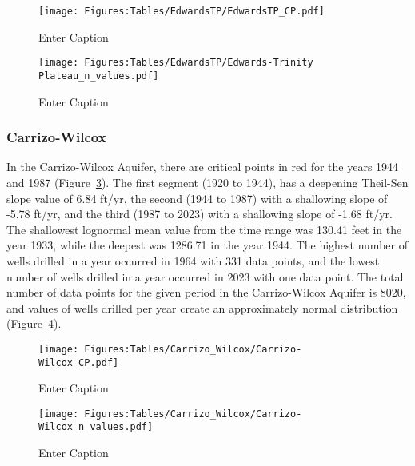 \begin{figure}[H]
    \centering
    \texttt{[image: Figures:Tables/EdwardsTP/EdwardsTP\_CP.pdf]}
    \caption{Enter Caption}
    \label{fig:ETP_CP}
\end{figure}
\begin{figure}[H]
    \centering
    \texttt{[image: Figures:Tables/EdwardsTP/Edwards-Trinity Plateau\_n\_values.pdf]}
    \caption{Enter Caption}
    \label{fig:ETP_n_value}
\end{figure}

\subsubsection*{Carrizo-Wilcox}
In the Carrizo-Wilcox Aquifer, there are critical points in red for the years 1944 and 1987 (Figure~\ref{fig:CW_CP}). The first segment (1920 to 1944),  has a deepening Theil-Sen slope value of 6.84 ft/yr, the second (1944 to 1987) with a shallowing slope of -5.78 ft/yr, and the third (1987 to 2023) with a shallowing slope of -1.68 ft/yr. The shallowest lognormal mean value from the time range was 130.41 feet in the year 1933, while the deepest was 1286.71 in the year 1944. The highest number of wells drilled in a year occurred in 1964 with 331 data points, and the lowest number of wells drilled in a year occurred in 2023 with one data point. The total number of data points for the given period in the Carrizo-Wilcox Aquifer is 8020, and values of wells drilled per year create an approximately normal distribution (Figure~\ref{fig:CW_n_value}).

\begin{figure}[H]
    \centering
    \texttt{[image: Figures:Tables/Carrizo\_Wilcox/Carrizo-Wilcox\_CP.pdf]}
    \caption{Enter Caption}
    \label{fig:CW_CP}
\end{figure}

\begin{figure}[H]
    \centering
    \texttt{[image: Figures:Tables/Carrizo\_Wilcox/Carrizo-Wilcox\_n\_values.pdf]}
    \caption{Enter Caption}
    \label{fig:CW_n_value}
\end{figure}

